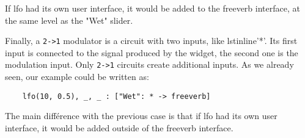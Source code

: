 If lfo had its own user interface, it would be added to the freeverb interface, at the same level as the "Wet" slider. 

Finally, a \lstinline`2->1` modulator is a circuit with two inputs, like lstinline'*'. Its first input is connected to the signal produced by the widget, the second one is the modulation input. Only \lstinline`2->1` circuits create additional inputs. As we already seen, our example could be written as:

\begin{lstlisting}
	lfo(10, 0.5), _, _ : ["Wet": * -> freeverb]
\end{lstlisting}
	
The main différence with the previous case is that if lfo had its own user interface, it would be added outside of the freeverb interface.

